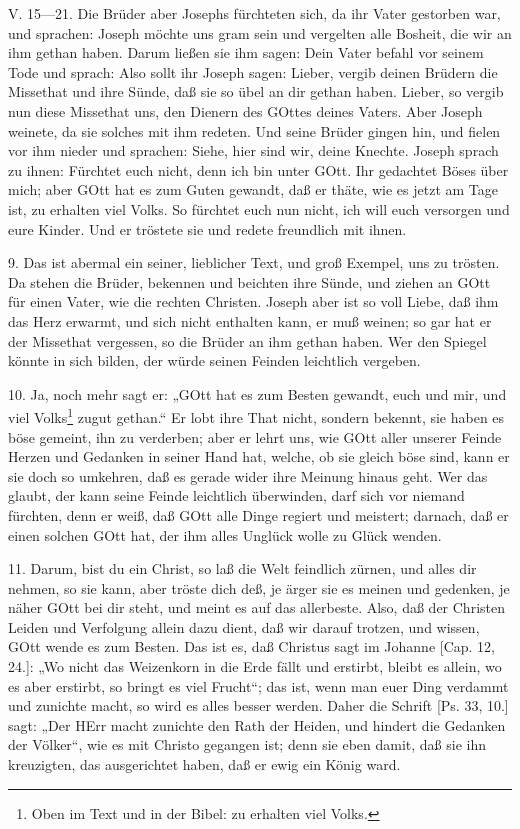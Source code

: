 \begin{schriftzitat}
V. 15—21. Die Brüder aber Josephs fürchteten sich, da ihr Vater gestorben war, und sprachen: Joseph möchte uns gram sein und vergelten alle Bosheit, die wir an ihm gethan haben. Darum ließen sie ihm sagen: Dein Vater befahl vor seinem Tode und sprach: Also sollt ihr Joseph sagen: Lieber, vergib deinen Brüdern die Missethat und ihre Sünde, daß sie so übel an dir gethan haben. Lieber, so vergib nun diese Missethat uns, den Dienern des GOttes deines Vaters. Aber Joseph weinete, da sie solches mit ihm redeten. Und seine Brüder gingen hin, und fielen vor ihm nieder und sprachen: Siehe, hier sind wir, deine Knechte. Joseph sprach zu ihnen: Fürchtet euch nicht, denn ich bin unter GOtt. Ihr gedachtet Böses über mich; aber GOtt hat es zum Guten gewandt, daß er thäte, wie es jetzt am Tage ist, zu erhalten viel Volks. So fürchtet euch nun nicht, ich will euch versorgen und eure Kinder. Und er tröstete sie und redete freundlich mit ihnen.
\end{schriftzitat}

9. Das ist abermal ein seiner, lieblicher Text, und groß Exempel, uns zu trösten. Da stehen die Brüder, bekennen und beichten ihre Sünde,
und ziehen an GOtt für einen Vater, wie die rechten Christen. Joseph aber ist so voll Liebe, daß ihm das Herz erwarmt, und sich nicht enthalten kann, er muß weinen; so gar hat er der Missethat vergessen, so die Brüder an ihm gethan haben. Wer den Spiegel könnte in sich bilden, der würde seinen Feinden leichtlich vergeben.

10. Ja, noch mehr sagt er: „GOtt hat es zum Besten gewandt, euch und mir, und viel Volks\footnote{Oben im Text und in der Bibel: zu erhalten viel Volks.} zugut gethan.“ Er lobt ihre That nicht, sondern bekennt, sie haben es böse gemeint, ihn zu verderben; aber er lehrt uns, wie GOtt aller unserer Feinde Herzen und Gedanken in seiner Hand hat, welche, ob sie gleich böse sind, kann er sie doch so umkehren, daß es gerade wider ihre Meinung hinaus geht. Wer das glaubt, der kann seine Feinde leichtlich überwinden, darf sich vor niemand fürchten, denn er weiß, daß GOtt alle Dinge regiert und meistert; darnach, daß er einen solchen GOtt hat, der ihm alles Unglück wolle zu Glück wenden.

11. Darum, bist du ein Christ, so laß die Welt feindlich zürnen, und alles dir nehmen, so sie kann, aber tröste dich deß, je ärger sie es meinen und gedenken, je näher GOtt bei dir steht, und meint es auf das allerbeste. Also, daß der Christen Leiden und Verfolgung allein dazu dient, daß wir darauf trotzen, und wissen, GOtt wende es zum Besten. Das ist es, daß Christus sagt im Johanne [Cap. 12, 24.]: „Wo nicht das Weizenkorn in die Erde fällt und erstirbt, bleibt es allein, wo es aber erstirbt, so bringt es viel Frucht“; das ist, wenn man euer Ding verdammt und zunichte macht, so wird es alles besser werden. Daher die Schrift [Ps. 33, 10.] sagt: „Der HErr macht zunichte den Rath der Heiden, und hindert die Gedanken der Völker“, wie es mit Christo gegangen ist; denn sie eben damit, daß sie ihn kreuzigten, das ausgerichtet haben, daß er ewig ein König ward.

